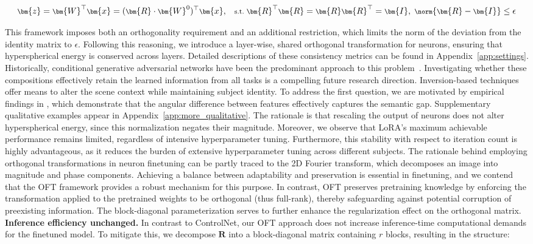 {\begin{itemize}[leftmargin=*,nosep]
\begin{equation}\label{eq:coft_general}
    \footnotesize
    \bm{z}=\bm{W}^\top\bm{x}=(\bm{R}\cdot\bm{W}^0)^\top\bm{x},~~~\text{s.t.}~\bm{R}^\top\bm{R}=\bm{R}\bm{R}^\top=\bm{I},~\norm{\bm{R}-\bm{I}}\leq \epsilon
\end{equation}

This framework imposes both an orthogonality requirement and an additional restriction, which limits the norm of the deviation from the identity matrix to $\epsilon$. Following this reasoning, we introduce a layer-wise, shared orthogonal transformation for neurons, ensuring that hyperspherical energy is conserved across layers. Detailed descriptions of these consistency metrics can be found in Appendix~\ref{app:settings}. Historically, conditional generative adversarial networks have been the predominant approach to this problem~\cite{isola2017image,zhu2017toward,wang2018high,park2019semantic,choi2018stargan}. Investigating whether these compositions effectively retain the learned information from all tasks is a compelling future research direction. Inversion-based techniques~\cite{choi2021ilvr,dhariwal2021diffusion,ramesh2022hierarchical,gal2022image} offer means to alter the scene context while maintaining subject identity. To address the first question, we are motivated by empirical findings in \cite{liu2018decoupled,chen2020angular}, which demonstrate that the angular difference between features effectively captures the semantic gap. Supplementary qualitative examples appear in Appendix~\ref{app:more_qualitative}. The rationale is that rescaling the output of neurons does not alter hyperspherical energy, since this normalization negates their magnitude. Moreover, we observe that LoRA’s maximum achievable performance remains limited, regardless of intensive hyperparameter tuning. Furthermore, this stability with respect to iteration count is highly advantageous, as it reduces the burden of extensive hyperparameter tuning across different subjects. The rationale behind employing orthogonal transformations in neuron finetuning can be partly traced to the 2D Fourier transform, which decomposes an image into magnitude and phase components. Achieving a balance between adaptability and preservation is essential in finetuning, and we contend that the OFT framework provides a robust mechanism for this purpose. In contrast, OFT preserves pretraining knowledge by enforcing the transformation applied to the pretrained weights to be orthogonal (thus full-rank), thereby safeguarding against potential corruption of preexisting information. The block-diagonal parameterization serves to further enhance the regularization effect on the orthogonal matrix. \textbf{Inference efficiency unchanged.} In contrast to ControlNet, our OFT approach does not increase inference-time computational demands for the finetuned model. To mitigate this, we decompose $\bm{R}$ into a block-diagonal matrix containing $r$ blocks, resulting in the structure:


\end{itemize}}
